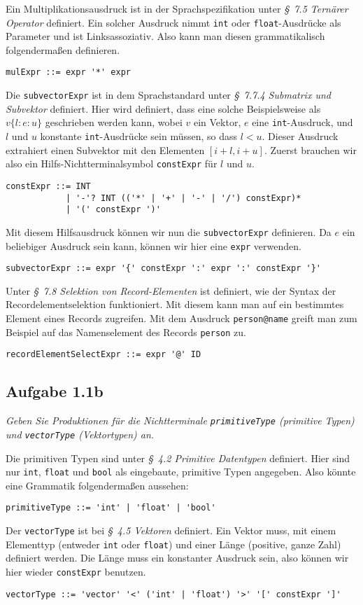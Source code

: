 \documentclass[
  ngerman,
  DIV=14
]{scrartcl}
\begin{document}
\bigskip\noindent
Ein Multiplikationsausdruck ist in der Sprachspezifikation unter \emph{§~7.5 Ternärer Operator} definiert. Ein solcher Ausdruck nimmt \verb|int| oder \verb|float|-Ausdrücke als Parameter und ist Linksassoziativ. Also kann man diesen grammatikalisch folgendermaßen definieren. 
\begin{lstlisting}
mulExpr ::= expr '*' expr
\end{lstlisting}
Die \verb|subvectorExpr| ist in dem Sprachstandard unter \emph{§~7.7.4 Submatrix und Subvektor} definiert. Hier wird definiert, dass eine solche Beispielsweise als $v\{l:e:u\}$ geschrieben werden kann, wobei $v$ ein Vektor, $e$ eine \texttt{int}-Ausdruck, und $l$ und $u$ konstante \texttt{int}-Ausdrücke sein müssen, so dass $l < u$. Dieser Ausdruck extrahiert einen Subvektor mit den Elementen $[i+l, i+u]$. Zuerst brauchen wir also ein Hilfs-Nichtterminalsymbol \texttt{constExpr} für $l$ und $u$.
\begin{lstlisting}
constExpr ::= INT
			| '-'? INT (('*' | '+' | '-' | '/') constExpr)*
            | '(' constExpr ')'
\end{lstlisting}
Mit diesem Hilfsausdruck können wir nun die \texttt{subvectorExpr} definieren. Da $e$ ein beliebiger Ausdruck sein kann, können wir hier eine \texttt{expr} verwenden. 
\begin{lstlisting}
subvectorExpr ::= expr '{' constExpr ':' expr ':' constExpr '}'  
\end{lstlisting}
Unter \emph{§~7.8 Selektion von Record-Elementen} ist definiert, wie der Syntax der Recordelementselektion funktioniert. Mit diesem kann man auf ein bestimmtes Element eines Records zugreifen. Mit dem Ausdruck \texttt{person@name} greift man zum Beispiel auf das Namenselement des Records \texttt{person} zu. 
\begin{lstlisting}
recordElementSelectExpr ::= expr '@' ID  
\end{lstlisting}

\subsection*{Aufgabe 1.1b}

\emph{Geben Sie Produktionen für die Nichtterminale \texttt{primitiveType} (primitive Typen) und \texttt{vectorType} (Vektortypen) an.}

\bigskip\noindent
Die primitiven Typen sind unter \emph{§~4.2 Primitive Datentypen} definiert. Hier sind nur \texttt{int}, \texttt{float} und \texttt{bool} als eingebaute, primitive Typen angegeben. Also könnte eine Grammatik folgendermaßen aussehen:
\begin{lstlisting}
primitiveType ::= 'int' | 'float' | 'bool'
\end{lstlisting}
Der \texttt{vectorType} ist bei \emph{§~4.5 Vektoren} definiert. Ein Vektor muss, mit einem Elementtyp (entweder \texttt{int} oder \texttt{float}) und einer Länge (positive, ganze Zahl) definiert werden. Die Länge muss ein konstanter Ausdruck sein, also können wir hier wieder \texttt{constExpr} benutzen.
\begin{lstlisting}
vectorType ::= 'vector' '<' ('int' | 'float') '>' '[' constExpr ']'
\end{lstlisting}
\end{document}
